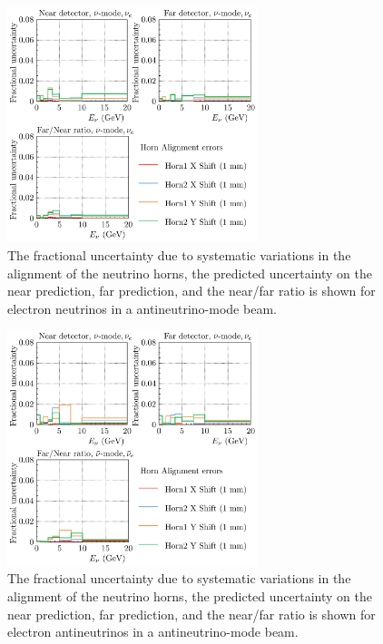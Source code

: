 \documentclass{article}
\begin{document}
\begin{figure}
  \centering
  \includegraphics[width=0.65\textwidth]{plots/fracerrs/nubarmode_nue_HornAlignment}
  \caption{The fractional uncertainty due to systematic variations in the alignment of the neutrino horns, the predicted uncertainty on the near prediction, far prediction, and the near/far ratio is shown for electron neutrinos in a antineutrino-mode beam.}
  \label{fig:hornalign_nubar_nue}
\end{figure}

\begin{figure}
  \centering
  \includegraphics[width=0.65\textwidth]{plots/fracerrs/nubarmode_nuebar_HornAlignment}
  \caption{The fractional uncertainty due to systematic variations in the alignment of the neutrino horns, the predicted uncertainty on the near prediction, far prediction, and the near/far ratio is shown for electron antineutrinos in a antineutrino-mode beam.}
  \label{fig:beamalign_nubar_nuebar}
\end{figure}
\end{document}

